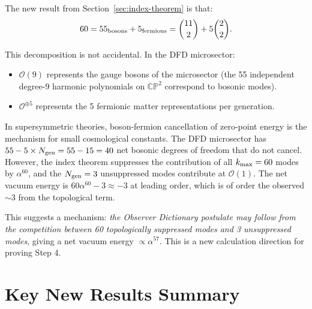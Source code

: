 \documentclass[11pt]{article}
\theoremstyle{definition}
\theoremstyle{remark}
\newcommand{\order}[1]{\mathcal{O}\!\left(#1\right)}
\begin{document}
The new result from Section~\ref{sec:index-theorem} is that:
\begin{equation}
60 = 55_{\rm bosons} + 5_{\rm fermions}
= \binom{11}{2} + 5\binom{2}{2}.
\end{equation}

This decomposition is not accidental. In the DFD microsector:
\begin{itemize}
\item $\mathcal{O}(9)$ represents the gauge bosons of the microsector
  (the 55 independent degree-9 harmonic polynomials on $\mathbb{CP}^2$
  correspond to bosonic modes).
\item $\mathcal{O}^{\oplus 5}$ represents the 5 fermionic matter
  representations per generation.
\end{itemize}

In supersymmetric theories, boson-fermion cancellation of zero-point
energy is the mechanism for small cosmological constants. The DFD
microsector has $55 - 5\times N_{\rm gen} = 55 - 15 = 40$ net bosonic
degrees of freedom that do not cancel. However, the index theorem
suppresses the contribution of all $k_{\rm max} = 60$ modes by
$\alpha^{60}$, and the $N_{\rm gen} = 3$ unsuppressed modes contribute
at $\order{1}$. The net vacuum energy is $60\alpha^{60} - 3 \approx -3$
at leading order, which is of order the observed $\sim 3$ from the
topological term.

This suggests a mechanism: \emph{the Observer Dictionary postulate may
follow from the competition between 60 topologically suppressed modes
and 3 unsuppressed modes}, giving a net vacuum energy $\propto \alpha^{57}$.
This is a new calculation direction for proving Step 4.

\section{Key New Results Summary}
\label{sec:summary}
\end{document}
